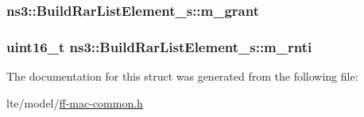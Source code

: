 \subsubsection[{\texorpdfstring{m\+\_\+grant}{m_grant}}]{ ns3\+::\+Build\+Rar\+List\+Element\+\_\+s\+::m\+\_\+grant}\hypertarget{structns3_1_1BuildRarListElement__s_acd5001d775fe5373d8f5a946faf9eab4}{}\label{structns3_1_1BuildRarListElement__s_acd5001d775fe5373d8f5a946faf9eab4}
\subsubsection[{\texorpdfstring{m\+\_\+rnti}{m_rnti}}]{\setlength{\rightskip}{0pt plus 5cm}uint16\+\_\+t ns3\+::\+Build\+Rar\+List\+Element\+\_\+s\+::m\+\_\+rnti}\hypertarget{structns3_1_1BuildRarListElement__s_a1684672178ed89847a81d2f53a0fcf92}{}\label{structns3_1_1BuildRarListElement__s_a1684672178ed89847a81d2f53a0fcf92}


The documentation for this struct was generated from the following file\+:\begin{DoxyCompactItemize}
\item 
lte/model/\hyperlink{ff-mac-common_8h}{ff-\/mac-\/common.\+h}\end{DoxyCompactItemize}
